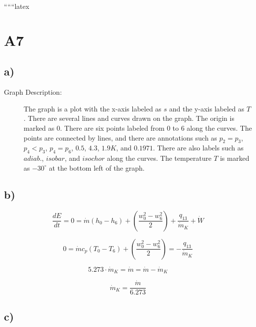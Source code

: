 
``````latex


\section*{A7}

\subsection*{a)}

\begin{description}
    \item[Graph Description:] The graph is a plot with the x-axis labeled as $s$ and the y-axis labeled as $T$. There are several lines and curves drawn on the graph. The origin is marked as $0$. There are six points labeled from $0$ to $6$ along the curves. The points are connected by lines, and there are annotations such as $p_2 = p_3$, $p_4 < p_3$, $p_4 = p_6$, $0.5$, $4.3$, $1.9K$, and $0.1971$. There are also labels such as $adiab.$, $isobar$, and $isochor$ along the curves. The temperature $T$ is marked as $-30^\circ$ at the bottom left of the graph.
\end{description}

\subsection*{b)}

\begin{equation*}
\frac{dE}{dt} = 0 = \dot{m} (h_0 - h_6) + \left( \frac{w_0^2 - w_6^2}{2} \right) + \frac{q_{13}}{\dot{m}_K} + \dot{W}
\end{equation*}

\begin{equation*}
0 = \dot{m} c_p (T_0 - T_6) + \left( \frac{w_0^2 - w_6^2}{2} \right) = - \frac{q_{13}}{\dot{m}_K}
\end{equation*}

\begin{equation*}
5.273 \cdot \dot{m}_K = \dot{m} = \dot{m} - \dot{m}_K
\end{equation*}

\begin{equation*}
\dot{m}_K = \frac{\dot{m}}{6.273}
\end{equation*}

\subsection*{c)}

